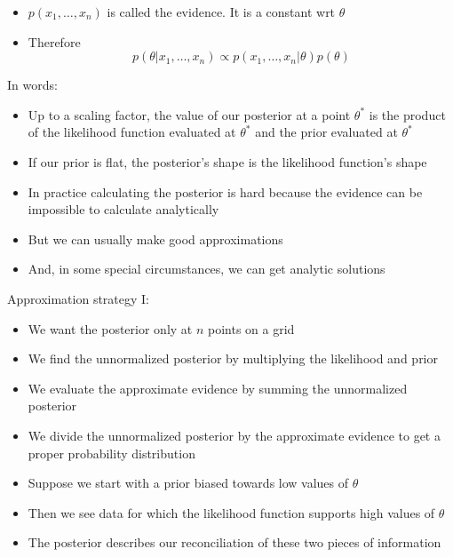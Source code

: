 \documentclass{beamer}
\begin{document}
\frame
{
  \begin{itemize}
    \item{$p(x_1, \ldots, x_n)$ is called the evidence. It is a constant wrt $\theta$}
    \item{Therefore}
    \[
    p(\theta | x_1, \ldots, x_n) \propto p(x_1, \ldots, x_n | \theta) p(\theta)
    \]
  \end{itemize}
}

\frame
{
 In words:
 \begin{itemize}
   \item{Up to a scaling factor, the value of our posterior at a point $\theta^{*}$ is the product of the likelihood function evaluated at $\theta^{*}$ and the prior evaluated at $\theta^{*}$}
   \item{If our prior is flat, the posterior's shape is the likelihood function's shape}
 \end{itemize}
}

\frame
{
  \begin{itemize}
    \item{In practice calculating the posterior is hard because the evidence can be impossible to calculate analytically}
    \item{But we can usually make good approximations}
    \item{And, in some special circumstances, we can get analytic solutions}
  \end{itemize}
}

\frame
{
 Approximation strategy I:
  \begin{itemize}
    \item{We want the posterior only at $n$ points on a grid}
    \item{We find the unnormalized posterior by multiplying the likelihood and prior}
    \item{We evaluate the approximate evidence by summing the unnormalized posterior}
    \item{We divide the unnormalized posterior by the approximate evidence to get a proper probability distribution}
  \end{itemize}
}

\frame
{
  \begin{itemize}
    \item{Suppose we start with a prior biased towards low values of $\theta$}
    \item{Then we see data for which the likelihood function supports high values of $\theta$}
    \item{The posterior describes our reconciliation of these two pieces of information}
  \end{itemize}
}
\end{document}
